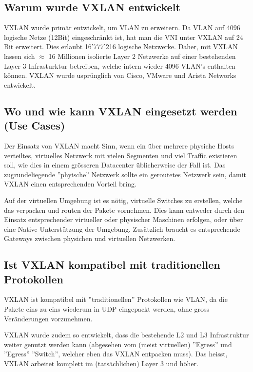 \subsection{Warum wurde VXLAN entwickelt}
VXLAN wurde primär entwickelt, um VLAN zu erweitern. Da VLAN auf 4096 logische Netze (12Bit) eingeschränkt ist, hat man die VNI unter VXLAN auf 24 Bit erweitert. Dies erlaubt 16'777'216 logische Netzwerke. Daher, mit VXLAN lassen sich $\approx$ 16 Millionen isolierte Layer 2 Netzwerke auf einer bestehenden Layer 3 Infrasturktur betreiben, welche intern wieder 4096 VLAN's enthalten können. VXLAN wurde usprünglich von Cisco, VMware und Arista Networks entwickelt. 

\subsection{Wo und wie kann VXLAN eingesetzt werden (Use Cases)}

Der Einsatz von VXLAN macht Sinn, wenn ein über mehrere physiche Hosts verteiltes, virtuelles Netzwerk mit vielen Segmenten und viel Traffic existieren soll, wie dies in einem grösseren Datacenter üblicherweise der Fall ist. Das zugrundeliegende ''phyische'' Netzwerk sollte ein geroutetes Netzwerk sein, damit VXLAN einen entsprechenden Vorteil bring.

Auf der virtuellen Umgebung ist es nötig, virtuelle Switches zu erstellen, welche das verpacken und routen der Pakete vornehmen. Dies kann entweder durch den Einsatz entsprechender virtueller oder physischer Maschinen erfolgen, oder über eine Native Unterstützung der Umgebung. Zusätzlich braucht es entsprechende Gateways zwischen physichen und virtuellen Netzwerken.

\subsection{Ist VXLAN kompatibel mit traditionellen Protokollen}

VXLAN ist kompatibel mit ''traditionellen'' Protokollen wie VLAN, da die Pakete eins zu eins wiederum in UDP eingepackt werden, ohne gross Veränderungen vorzunehmen. 

VXLAN wurde zudem so entwickelt, dass die bestehende L2 und L3 Infrastruktur weiter genutzt werden kann (abgesehen vom (meist virtuellen) ''Egress'' und ''Egress'' ''Switch'', welcher eben das VXLAN entpacken muss). Das heisst, VXLAN arbeitet komplett im (tatsächlichen) Layer 3 und höher.


